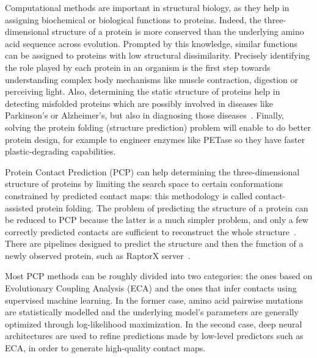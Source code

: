     Computational methods are important in structural biology,
    as they help in assigning biochemical or biological functions to proteins.
    Indeed, the three-dimensional structure of a protein is more conserved than the
    underlying amino acid sequence across evolution.
    Prompted by this knowledge, similar functions
    can be assigned to proteins with low structural dissimilarity.
    Precisely identifying the role played by each protein in an organism is the first step
    towards understanding complex body mechanisms like muscle contraction, digestion or perceiving light.
    Also, determining the static structure of proteins help in detecting misfolded proteins
    which are possibly involved in diseases like Parkinson's or
    Alzheimer's, but also in diagnosing those diseases~\cite{forloni2002protein}.
    Finally, solving the protein folding (structure prediction) problem will enable
    to do better protein design, for example to engineer enzymes like PETase
    so they have faster plastic-degrading capabilities.

    Protein Contact Prediction (PCP) can help determining the three-dimensional structure of
    proteins by limiting the search space to certain conformations
    constrained by predicted contact maps: this methodology is called contact-assisted protein folding.
    The problem of predicting the structure of a protein can be reduced to PCP because the latter is a much simpler problem,
    and only a few correctly predicted contacts are sufficient to reconstruct the whole structure~\cite{kim2014one}.
    There are pipelines designed to predict the structure and then the function of a newly
    observed protein, such as RaptorX server~\cite{peng2011raptorx}.

    Most PCP methods can be roughly divided into two categories:
    the ones based on Evolutionary Coupling Analysis (ECA) and the ones that infer contacts using
    supervised machine learning. In the former case, amino acid pairwise mutations are statistically modelled and the underlying model's parameters
    are generally optimized through log-likelihood maximization. In the second case, deep neural architectures are used to
    refine predictions made by low-level predictors such as ECA, in order to generate high-quality contact maps.


